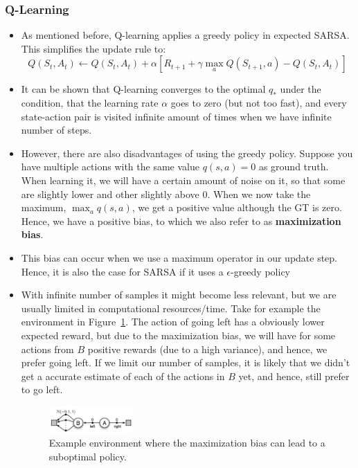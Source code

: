 \subsubsection{Q-Learning}
\begin{itemize}
	\item As mentioned before, Q-learning applies a greedy policy in expected SARSA. This simplifies the update rule to:
	$$Q(S_t,A_t)\leftarrow Q(S_t,A_t) + \alpha\left[R_{t+1}+\gamma \max_a  Q(S_{t+1},a)-Q(S_t,A_t)\right]$$
	\item It can be shown that Q-learning converges to the optimal $q_{*}$ under the condition, that the learning rate $\alpha$ goes to zero (but not too fast), and every state-action pair is visited infinite amount of times when we have infinite number of steps.
	\item However, there are also disadvantages of using the greedy policy. Suppose you have multiple actions with the same value $q(s,a)=0$ as ground truth. When learning it, we will have a certain amount of noise on it, so that some are slightly lower and other slightly above 0. When we now take the maximum, $\max_a q(s,a)$, we get a positive value although the GT is zero. Hence, we have a positive bias, to which we also refer to as \textbf{maximization bias}.
	\item This bias can occur when we use a maximum operator in our update step. Hence, it is also the case for SARSA if it uses a $\epsilon$-greedy policy
	\item With infinite number of samples it might become less relevant, but we are usually limited in computational resources/time. Take for example the environment in Figure~\ref{fig:rl_tabular_methods_maximization_bias}. The action of going left has a obviously lower expected reward, but due to the maximization bias, we will have for some actions from $B$ positive rewards (due to a high variance), and hence, we prefer going left. If we limit our number of samples, it is likely that we didn't get a accurate estimate of each of the actions in $B$ yet, and hence, still prefer to go left.
	\begin{figure}[ht!]
		\centering
		\includegraphics[width=0.3\textwidth]{figures/rl_tabular_methods_maximization_bias.png}
		\caption{Example environment where the maximization bias can lead to a suboptimal policy.}
		\label{fig:rl_tabular_methods_maximization_bias}
	\end{figure}


\end{itemize}
